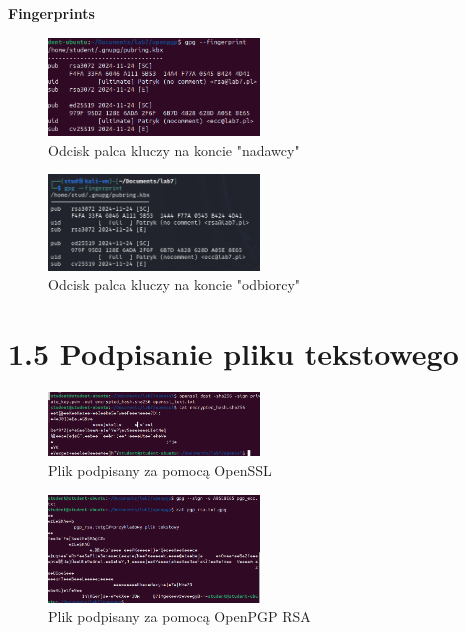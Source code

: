 \documentclass{article}
\begin{document}
\textbf{Fingerprints}
\begin{figure}[H]
    \centering
    \includegraphics[width=0.5\textwidth]{ubuntu_fingerprint.png}
    \caption{Odcisk palca kluczy na koncie "nadawcy"}
\end{figure}

\begin{figure}[H]
    \centering
    \includegraphics[width=0.5\textwidth]{fingerprint_kali.png}
    \caption{Odcisk palca kluczy na koncie "odbiorcy"}
\end{figure}




\section*{1.5 Podpisanie pliku tekstowego}

\begin{figure}[H]
    \centering
    \includegraphics[width=0.5\textwidth]{openssl_signed.png}
    \caption{Plik podpisany za pomocą OpenSSL}
\end{figure}


\begin{figure}[H]
    \centering
    \includegraphics[width=0.5\textwidth]{openpgp_signed_ecc.png}
    \caption{Plik podpisany za pomocą OpenPGP RSA}
\end{figure}
\end{document}
